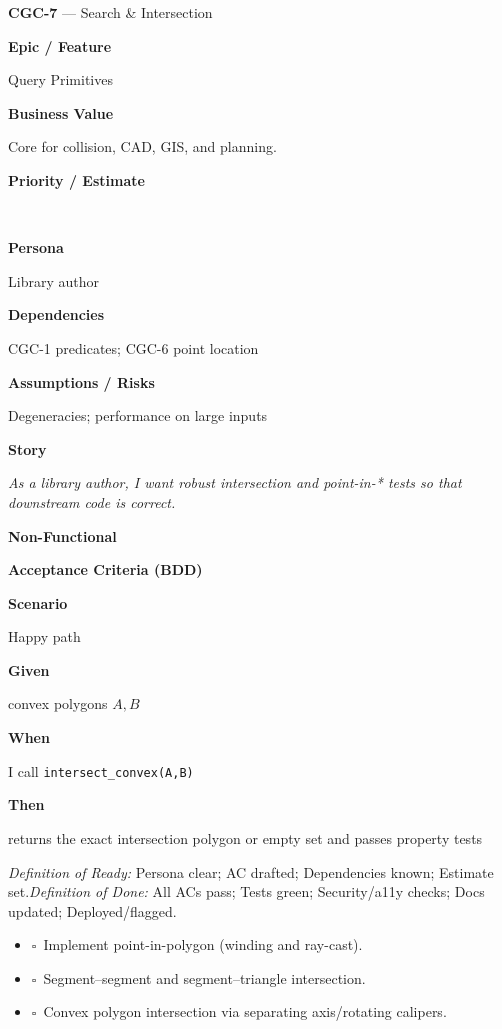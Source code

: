 \documentclass[11pt,a4paper]{article}
\newcommand{\MetaRow}[2]{%
  \noindent\begin{minipage}[t]{0.24\linewidth}\raggedleft\bfseries #1\end{minipage}%
  \hspace{0.8em}%
  \begin{minipage}[t]{0.72\linewidth}\raggedright #2\end{minipage}\par\vspace{0.3em}}
\newcommand{\CBox}{\(\square\)}
\newcommand{\BDDRow}[2]{\MetaRow{#1}{#2}}
\newenvironment{BDD}{\par\medskip}{\par\medskip}
\newcommand{\StoryTitle}[2]{\textbf{#1} --- #2}
\newcommand{\DoR}{\textit{Definition of Ready:} Persona clear; AC drafted; Dependencies known; Estimate set.}
\newcommand{\DoD}{\textit{Definition of Done:} All ACs pass; Tests green; Security/a11y checks; Docs updated; Deployed/flagged.}
\begin{document}
\begin{StoryCard}{\StoryTitle{CGC-7}{Search \& Intersection}}
\MetaRow{Epic / Feature}{Query Primitives}
\MetaRow{Business Value}{Core for collision, CAD, GIS, and planning.}
\MetaRow{Priority / Estimate}{\ \ \Badge{SP: 5}}
\MetaRow{Persona}{Library author}
\MetaRow{Dependencies}{CGC-1 predicates; CGC-6 point location}
\MetaRow{Assumptions / Risks}{Degeneracies; performance on large inputs}
\MetaRow{Story}{\emph{As a library author, I want robust intersection and point-in-* tests so that downstream code is correct.}}

\medskip
\noindent\textbf{Non-Functional}\quad
{}\ \ 

\medskip
\noindent\textbf{Acceptance Criteria (BDD)}
\begin{BDD}
\BDDRow{Scenario}{Happy path}
\BDDRow{Given}{convex polygons $A,B$}
\BDDRow{When}{I call \texttt{intersect\_convex(A,B)}}
\BDDRow{Then}{returns the exact intersection polygon or empty set and passes property tests}
\end{BDD}

\medskip
{\footnotesize \DoR\quad\textbullet\quad \DoD}
\end{StoryCard}

\begin{TaskBox}
\begin{itemize}
  \item \CBox\ Implement point-in-polygon (winding and ray-cast).
  \item \CBox\ Segment--segment and segment--triangle intersection.
  \item \CBox\ Convex polygon intersection via separating axis/rotating calipers.
\end{itemize}
\end{TaskBox}

\clearpage
\end{document}

